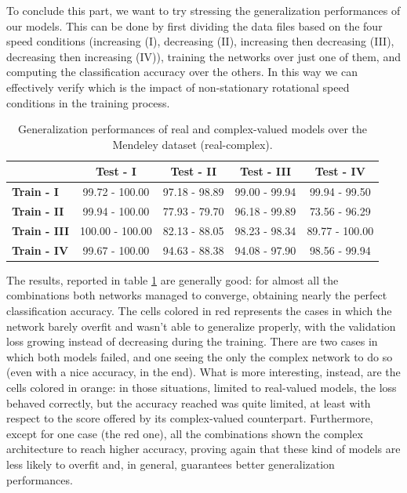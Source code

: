 \documentclass[../main.tex]{subfiles}
\begin{document}
To conclude this part, we want to try stressing the generalization performances of our models. This can be done by first dividing the data files based on the four speed conditions (increasing (I), decreasing (II), increasing then decreasing (III), decreasing then increasing (IV)), training the networks over just one of them, and computing the classification accuracy over the others. In this way we can effectively verify which is the impact of non-stationary rotational speed conditions in the training process.
\begin{table}[ht]
	\centering
	\begin{tabular}{l|c|c|c|c}
		 & \textbf{Test - I} & \textbf{Test - II} & \textbf{Test - III} & \textbf{Test - IV} \\
		\toprule
		\textbf{Train - I} & 99.72 - 100.00 & 97.18 - 98.89 & 99.00 - 99.94 & 99.94 - 99.50\\
		\midrule
		\textbf{Train - II} & 99.94 - 100.00 & \cellcolor{red} 77.93 - 79.70 & 96.18 - 99.89 & \cellcolor{orange} 73.56 - 96.29\\
		\midrule
		\textbf{Train - III} & 100.00 - 100.00 & \cellcolor{red} 82.13 - 88.05 & 98.23 - 98.34 & \cellcolor{orange} 89.77 - 100.00\\
		\midrule
		\textbf{Train - IV} & 99.67 - 100.00 & \cellcolor{red} 94.63 - 88.38 & 94.08 - 97.90 & 98.56 - 99.94\\
		\bottomrule
	\end{tabular}
	\caption{Generalization performances of real and complex-valued models over the Mendeley dataset (real-complex).}
	\label{tab:mendeley_generalization}
\end{table}
The results, reported in table \ref{tab:mendeley_generalization} are generally good: for almost all the combinations both networks managed to converge, obtaining nearly the perfect classification accuracy. The cells colored in red represents the cases in which the network barely overfit and wasn't able to generalize properly, with the validation loss growing instead of decreasing during the training. There are two cases in which both models failed, and one seeing the only the complex network to do so (even with a nice accuracy, in the end). What is more interesting, instead, are the cells colored in orange: in those situations, limited to real-valued models, the loss behaved correctly, but the accuracy reached was quite limited, at least with respect to the score offered by its complex-valued counterpart. Furthermore, except for one case (the red one), all the combinations shown the complex architecture to reach higher accuracy, proving again that these kind of models are less likely to overfit and, in general, guarantees better generalization performances.




	
\end{document}
